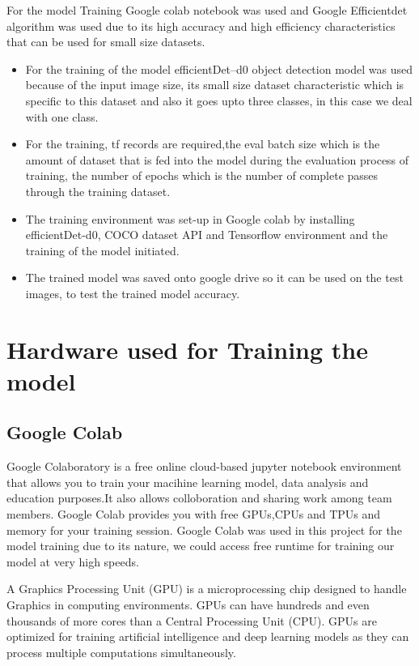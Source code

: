 \documentclass[12pt]{report}
\begin{document}
For the model Training Google colab notebook was used and Google Efficientdet algorithm was used due to its  high accuracy and high efficiency characteristics that can be used for small size datasets.

\begin{itemize}[topsep=0pt]

\item For the training of the model efficientDet--d0 object detection model was used because of the input image size, its small size dataset characteristic which is specific to this dataset and also it goes upto three classes, in this case we deal with one class\cite{det}.

\item For the training, tf records are required,the eval batch size which is the amount of dataset that is fed into the model during the evaluation process of training, the number of epochs which is the number of complete passes through the training dataset.

\item  The training environment was set-up in Google colab by installing efficientDet-d0, COCO dataset API and Tensorflow environment and the training of the model initiated.

\item The trained model was saved onto google drive so it can be used on the test images, to test the trained model accuracy.

\end{itemize}

\section{Hardware used for Training the model}

\subsection{Google Colab}
Google Colaboratory is a free online cloud-based jupyter notebook environment that allows you to train your macihine learning model, data analysis and education purposes.It also allows colloboration and sharing work among team members. Google Colab provides you with free GPUs,CPUs and TPUs and memory for your training session.
Google Colab was used in this project for the model training due to its nature, we could access free runtime for training our model at very high speeds\cite{Colab}.

A Graphics Processing Unit (GPU) is a microprocessing chip designed to handle Graphics in computing environments. GPUs can have hundreds and even thousands of more cores than a Central Processing Unit (CPU).
 GPUs are optimized for training artificial intelligence and deep learning models as they can process multiple computations simultaneously\cite{GPU}.
\end{document}
